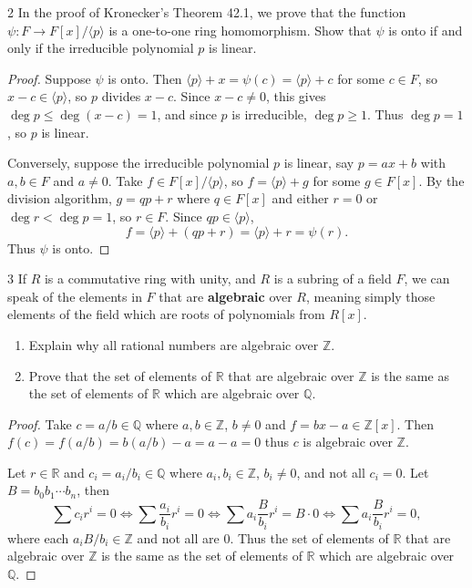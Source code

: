 \begin{problem}{2}
    In the proof of Kronecker's Theorem 42.1, we prove that the function
    $\psi : F \to F[x]/\langle p \rangle$ is a one-to-one ring homomorphism.
    Show that $\psi$ is onto if and only if the irreducible polynomial $p$
    is linear.
\end{problem}
\solved

\begin{proof}
    Suppose $\psi$ is onto. Then $\langle p \rangle + x = \psi(c) = \langle p \rangle + c$
    for some $c \in F$, so $x - c \in \langle p \rangle$, so $p$ divides $x - c$.
    Since $x - c \neq 0$, this gives $\deg p \leq \deg(x - c) = 1$, and since $p$ is
    irreducible, $\deg p \geq 1$. Thus $\deg p = 1$, so $p$ is linear.

    Conversely, suppose the irreducible polynomial $p$ is linear, say
    $p = ax + b$ with $a, b \in F$ and $a \neq 0$.
    Take $f \in F[x]/\langle p \rangle$, so $f = \langle p \rangle + g$ for some $g \in F[x]$.
    By the division algorithm, $g = qp + r$ where $q \in F[x]$ and either $r = 0$
    or $\deg r < \deg p = 1$, so $r \in F$.
    Since $qp \in \langle p \rangle$,
    \[f = \langle p \rangle + (qp + r) = \langle p \rangle + r = \psi(r).\]
    Thus $\psi$ is onto.
\end{proof}

\begin{problem}{3}
    If $R$ is a commutative ring with unity, and $R$ is a subring of a field
    $F$, we can speak of the elements in $F$ that are \textbf{algebraic} over
    $R$, meaning simply those elements of the field which are roots of
    polynomials from $R[x]$.
    \begin{enumerate}
        \item[(a)] Explain why all rational numbers are algebraic over $\mathbb{Z}$.
        \item[(b)] Prove that the set of elements of $\mathbb{R}$ that are
        algebraic over $\mathbb{Z}$ is the same as the set of elements of
        $\mathbb{R}$ which are algebraic over $\mathbb{Q}$.
    \end{enumerate}
\end{problem}
\solved

\begin{proof}
    Take $c = a/b \in \mathbb{Q}$ where $a, b \in \mathbb{Z}$, $b \ne 0$ and $f = bx - a \in \mathbb{Z}[x]$.
    Then $f(c) = f(a/b) = b(a/b) - a = a - a = 0$ thus $c$ is algebraic over $\mathbb{Z}$.

    Let $r \in \mathbb{R}$ and $c_i = a_i/b_i \in \mathbb{Q}$ where $a_i, b_i \in \mathbb{Z}$, $b_i \neq 0$,
    and not all $c_i = 0$.
    Let $B = b_0 b_1 \cdots b_n$, then
    \[\sum c_i r^i = 0 \iff \sum \frac{a_i}{b_i} r^i = 0 \iff \sum a_i \frac{B}{b_i} r^i = B \cdot 0 \iff \sum a_i \frac{B}{b_i} r^i = 0,\]
    where each $a_i B / b_i \in \mathbb{Z}$ and not all are $0$.
    Thus the set of elements of $\mathbb{R}$ that are
        algebraic over $\mathbb{Z}$ is the same as the set of elements of
        $\mathbb{R}$ which are algebraic over $\mathbb{Q}$.
\end{proof}

